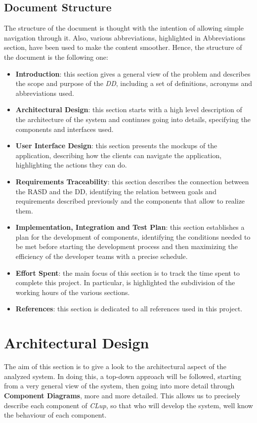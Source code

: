 \documentclass{article}
\begin{document}
	\subsection{Document Structure}
		The structure of the document is thought with the intention of allowing simple navigation through it. Also, various abbreviations, highlighted in Abbreviations section, have been used to make the content smoother.
		Hence, the structure of the document is the following one:
		\begin{itemize}
			\item {\bfseries Introduction}: this section gives a general view of the problem and describes the scope and purpose of the \emph{DD}, including a set of definitions, acronyms and abbreviations used.
			
			\item {\bfseries Architectural Design}: this section starts with a high level description of the architecture of the system and continues going into details, specifying the components and interfaces used.
			
			\item {\bfseries User Interface Design}: this section presents the mockups of the application, describing how the clients can navigate the application, highlighting the actions they can do.
			
			\item {\bfseries Requirements Traceability}: this section describes the connection between the RASD and the DD, identifying the relation between goals and requirements described previously and the components that allow to realize them.
			
			\item {\bfseries Implementation, Integration and Test Plan}: this section establishes a plan for the development of components, identifying the conditions needed to be met before starting the development process and then maximizing the efficiency of the developer teams with a precise schedule.
			
			\item {\bfseries Effort Spent}: the main focus of this section is to track the time spent to complete this project. In particular, is highlighted the subdivision of the working hours of the various sections.
			
			\item {\bfseries References}: this section is dedicated to all references used in this project.
		\end{itemize}
	\newpage
\section{Architectural Design}
	The aim of this section is to give a look to the architectural aspect of the analyzed system. In doing this, a top-down approach will be followed, starting from a very general view of the system, then going into more detail through {\bfseries Component Diagrams}, more and more detailed. This allows us to precisely describe each component of \emph{CLup}, so that who will develop the system, well know the behaviour of each component.
	
\end{document}
